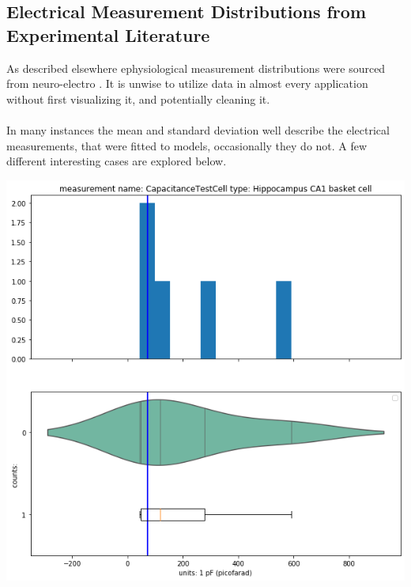 \subsection{Electrical Measurement Distributions from Experimental Literature}%
As described elsewhere ephysiological measurement distributions were sourced from neuro-electro \cite{tripathy2014neuroelectro}. It is unwise to utilize data in almost every application without first visualizing it, and potentially cleaning it.\\
\\
In many instances the mean and standard deviation well describe the electrical measurements, that were fitted to models, occasionally they do not. A few different interesting cases are explored below.



    


    \begin{center}
    \includegraphics[width=0.7\linewidth]{notebooks_converted/needata_thesis_files/needata_thesis_5_4}
    \end{center}

